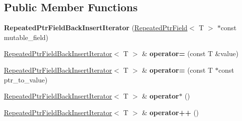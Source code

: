 \subsection*{Public Member Functions}
\begin{DoxyCompactItemize}
\item 
\mbox{\label{classgoogle_1_1protobuf_1_1internal_1_1RepeatedPtrFieldBackInsertIterator_ac4afe7e48786dcda2d10a96734c2595b}} 
{\bfseries Repeated\+Ptr\+Field\+Back\+Insert\+Iterator} (\hyperlink{classgoogle_1_1protobuf_1_1RepeatedPtrField}{Repeated\+Ptr\+Field}$<$ T $>$ $\ast$const mutable\+\_\+field)
\item 
\mbox{\label{classgoogle_1_1protobuf_1_1internal_1_1RepeatedPtrFieldBackInsertIterator_a3eb104bc160bdda2d142adc7fadda938}} 
\hyperlink{classgoogle_1_1protobuf_1_1internal_1_1RepeatedPtrFieldBackInsertIterator}{Repeated\+Ptr\+Field\+Back\+Insert\+Iterator}$<$ T $>$ \& {\bfseries operator=} (const T \&value)
\item 
\mbox{\label{classgoogle_1_1protobuf_1_1internal_1_1RepeatedPtrFieldBackInsertIterator_aec2750bd3ab777937fdbfadf8457217d}} 
\hyperlink{classgoogle_1_1protobuf_1_1internal_1_1RepeatedPtrFieldBackInsertIterator}{Repeated\+Ptr\+Field\+Back\+Insert\+Iterator}$<$ T $>$ \& {\bfseries operator=} (const T $\ast$const ptr\+\_\+to\+\_\+value)
\item 
\mbox{\label{classgoogle_1_1protobuf_1_1internal_1_1RepeatedPtrFieldBackInsertIterator_a4cd62c7aa7752292c0fcd6cf3e169896}} 
\hyperlink{classgoogle_1_1protobuf_1_1internal_1_1RepeatedPtrFieldBackInsertIterator}{Repeated\+Ptr\+Field\+Back\+Insert\+Iterator}$<$ T $>$ \& {\bfseries operator$\ast$} ()
\item 
\mbox{\label{classgoogle_1_1protobuf_1_1internal_1_1RepeatedPtrFieldBackInsertIterator_a31fd203ea896217a4256f624e187a6b4}} 
\hyperlink{classgoogle_1_1protobuf_1_1internal_1_1RepeatedPtrFieldBackInsertIterator}{Repeated\+Ptr\+Field\+Back\+Insert\+Iterator}$<$ T $>$ \& {\bfseries operator++} ()

\end{DoxyCompactItemize}
